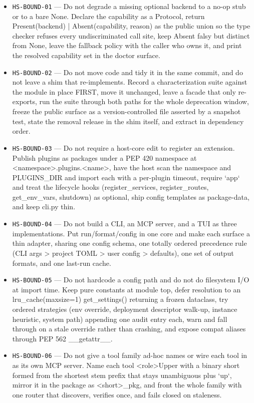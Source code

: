 \documentclass[11pt]{article}
\begin{document}
\begin{itemize}
  \item \texttt{HS-BOUND-01} --- Do not degrade a missing optional backend to a no-op stub or to a bare None. Declare the capability as a Protocol, return Present(backend) | Absent(capability, reason) as the public union so the type checker refuses every undiscriminated call site, keep Absent falsy but distinct from None, leave the fallback policy with the caller who owns it, and print the resolved capability set in the doctor surface. %
  \item \texttt{HS-BOUND-02} --- Do not move code and tidy it in the same commit, and do not leave a shim that re-implements. Record a characterization suite against the module in place FIRST, move it unchanged, leave a facade that only re-exports, run the suite through both paths for the whole deprecation window, freeze the public surface as a version-controlled file asserted by a snapshot test, state the removal release in the shim itself, and extract in dependency order. %
  \item \texttt{HS-BOUND-03} --- Do not require a host-core edit to register an extension. Publish plugins as packages under a PEP 420 namespace at <namespace>.plugins.<name>, have the host scan the namespace and PLUGINS\_DIR and import each with a per-plugin timeout, require `app` and treat the lifecycle hooks (register\_services, register\_routes, get\_env\_vars, shutdown) as optional, ship config templates as package-data, and keep cli.py thin. %
  \item \texttt{HS-BOUND-04} --- Do not build a CLI, an MCP server, and a TUI as three implementations. Put run/format/config in one core and make each surface a thin adapter, sharing one config schema, one totally ordered precedence rule (CLI args > project TOML > user config > defaults), one set of output formats, and one last-run cache. %
  \item \texttt{HS-BOUND-05} --- Do not hardcode a config path and do not do filesystem I/O at import time. Keep pure constants at module top, defer resolution to an lru\_cache(maxsize=1) get\_settings() returning a frozen dataclass, try ordered strategies (env override, deployment descriptor walk-up, instance heuristic, system path) appending one audit entry each, warn and fall through on a stale override rather than crashing, and expose compat aliases through PEP 562 \_\_getattr\_\_. %
  \item \texttt{HS-BOUND-06} --- Do not give a tool family ad-hoc names or wire each tool in as its own MCP server. Name each tool <role>Upper with a binary short formed from the shortest stem prefix that stays unambiguous plus `up`, mirror it in the package as <short>\_pkg, and front the whole family with one router that discovers, verifies once, and fails closed on staleness. %

\end{itemize}
\end{document}
